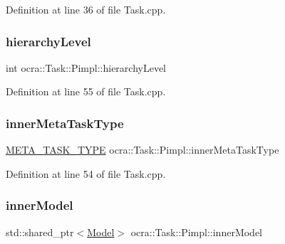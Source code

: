 Definition at line 36 of file Task.\+cpp.

\hypertarget{structocra_1_1Task_1_1Pimpl_a16b28bba8d6425b4bc7375297dd2cd47}{}\label{structocra_1_1Task_1_1Pimpl_a16b28bba8d6425b4bc7375297dd2cd47} 
\subsubsection{\texorpdfstring{hierarchy\+Level}{hierarchyLevel}}
{\footnotesize\ttfamily int ocra\+::\+Task\+::\+Pimpl\+::hierarchy\+Level}



Definition at line 55 of file Task.\+cpp.

\hypertarget{structocra_1_1Task_1_1Pimpl_a74f9aa5427e6161018203a9e75da3bf4}{}\label{structocra_1_1Task_1_1Pimpl_a74f9aa5427e6161018203a9e75da3bf4} 
\subsubsection{\texorpdfstring{inner\+Meta\+Task\+Type}{innerMetaTaskType}}
{\footnotesize\ttfamily \hyperlink{classocra_1_1Task_a8ddf2840d178ca273e886c9ca95248fe}{M\+E\+T\+A\+\_\+\+T\+A\+S\+K\+\_\+\+T\+Y\+PE} ocra\+::\+Task\+::\+Pimpl\+::inner\+Meta\+Task\+Type}



Definition at line 54 of file Task.\+cpp.

\hypertarget{structocra_1_1Task_1_1Pimpl_a6a98b6fb3efab282ba6d5092245b36d1}{}\label{structocra_1_1Task_1_1Pimpl_a6a98b6fb3efab282ba6d5092245b36d1} 
\subsubsection{\texorpdfstring{inner\+Model}{innerModel}}
{\footnotesize\ttfamily std\+::shared\+\_\+ptr$<$\hyperlink{classocra_1_1Model}{Model}$>$ ocra\+::\+Task\+::\+Pimpl\+::inner\+Model}



